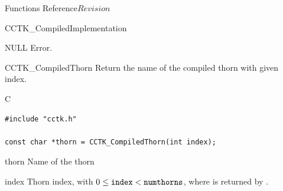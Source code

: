 \begin{cactuspart}{ Functions Reference}{}{$Revision$}
\begin{FunctionDescription}{CCTK\_CompiledImplementation}
\begin{ErrorSection}
\begin{Error}{NULL}
Error.
\end{Error}
\end{ErrorSection}
\end{FunctionDescription}



\begin{FunctionDescription}{CCTK\_CompiledThorn}
\label{CCTK-CompiledThorn}
Return the name of the compiled thorn with given index.

\begin{SynopsisSection}
\begin{Synopsis}{C}
\begin{verbatim}
#include "cctk.h"

const char *thorn = CCTK_CompiledThorn(int index);
\end{verbatim}
\end{Synopsis}
\end{SynopsisSection}

\begin{ResultSection}
\begin{Result}{thorn}
Name of the thorn
\end{Result}
\end{ResultSection}

\begin{ParameterSection}
\begin{Parameter}{index}
Thorn index, with $0 \le \mbox{\texttt{index}} < \mbox{\texttt{numthorns}}$, where
 is returned by .
\end{Parameter}
\end{ParameterSection}


\end{FunctionDescription}
\end{cactuspart}
